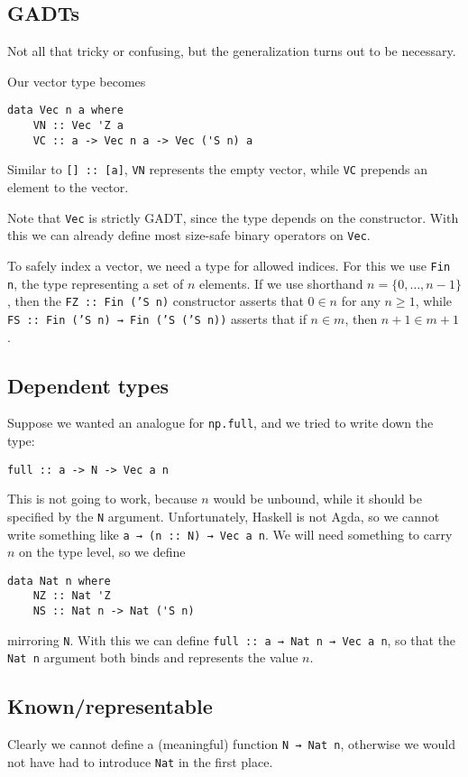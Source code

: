 \documentclass{article}
\begin{document}
    \subsection{GADTs}
    Not all that tricky or confusing, but the generalization turns out to be necessary.

    Our vector type becomes
\begin{verbatim}
data Vec n a where
    VN :: Vec 'Z a 
    VC :: a -> Vec n a -> Vec ('S n) a
\end{verbatim}
    Similar to \texttt{[] :: [a]}, \texttt{VN} represents the empty vector,
    while \texttt{VC} prepends an element to the vector.
    
    Note that \texttt{Vec} is strictly GADT, since the type depends on the constructor.
    With this we can already define most size-safe binary operators on \texttt{Vec}.
    
    To safely index a vector, we need a type for allowed indices.
    For this we use \texttt{Fin n}, the type representing a set of $n$ elements.
    If we use shorthand $n = \{0, \dots, n - 1\}$, then the \texttt{FZ :: Fin ('S n)} constructor asserts that $0 \in n$ for any $n \geq 1$,
    while \texttt{FS :: Fin ('S n) → Fin ('S ('S n))} asserts that if $n \in m$,
    then $n + 1 \in m + 1$.
    
    \subsection{Dependent types}
    Suppose we wanted an analogue for \texttt{np.full}, and we tried to write down the type:
\begin{verbatim}
full :: a -> N -> Vec a n
\end{verbatim}

    This is not going to work, because $n$ would be unbound, while it should be specified by the \texttt{N} argument. Unfortunately, Haskell is not Agda, so we cannot write something like \texttt{a → (n :: N) → Vec a n}. We will need something to carry $n$ on the type level, so we define
\begin{verbatim}
data Nat n where
    NZ :: Nat 'Z
    NS :: Nat n -> Nat ('S n)
\end{verbatim}
    mirroring \texttt{N}. With this we can define \texttt{full :: a → Nat n → Vec a n},
    so that the \texttt{Nat n} argument both binds and represents the value $n$. 

    \subsection{Known/representable}
    Clearly we cannot define a (meaningful) function \texttt{N → Nat n},
    otherwise we would not have had to introduce \texttt{Nat} in the first place.
    
\end{document}
